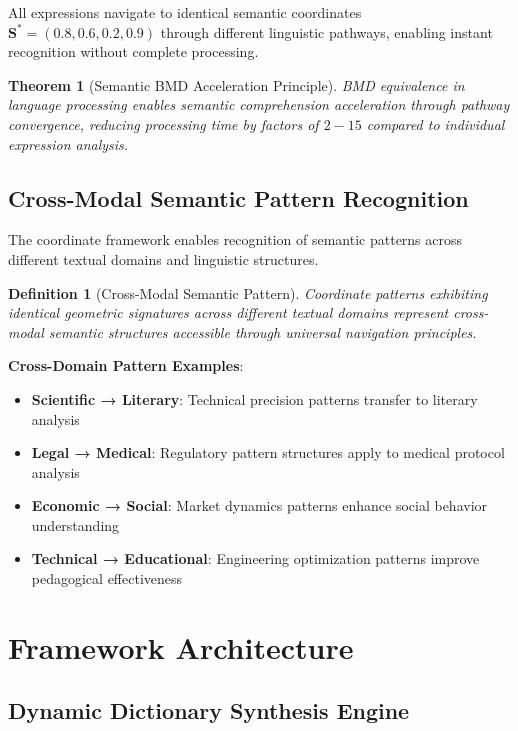 \documentclass[12pt,a4paper]{article}
\newtheorem{theorem}{Theorem}
\newtheorem{definition}{Definition}
\begin{document}
All expressions navigate to identical semantic coordinates $\mathbf{S}^* = (0.8, 0.6, 0.2, 0.9)$ through different linguistic pathways, enabling instant recognition without complete processing.

\begin{theorem}[Semantic BMD Acceleration Principle]
BMD equivalence in language processing enables semantic comprehension acceleration through pathway convergence, reducing processing time by factors of $2-15$ compared to individual expression analysis.
\end{theorem}

\subsection{Cross-Modal Semantic Pattern Recognition}

The coordinate framework enables recognition of semantic patterns across different textual domains and linguistic structures.

\begin{definition}[Cross-Modal Semantic Pattern]
Coordinate patterns exhibiting identical geometric signatures across different textual domains represent cross-modal semantic structures accessible through universal navigation principles.
\end{definition}

\textbf{Cross-Domain Pattern Examples}:
\begin{itemize}
\item \textbf{Scientific → Literary}: Technical precision patterns transfer to literary analysis
\item \textbf{Legal → Medical}: Regulatory pattern structures apply to medical protocol analysis
\item \textbf{Economic → Social}: Market dynamics patterns enhance social behavior understanding
\item \textbf{Technical → Educational}: Engineering optimization patterns improve pedagogical effectiveness
\end{itemize}

\section{Framework Architecture}

\subsection{Dynamic Dictionary Synthesis Engine}
\end{document}
